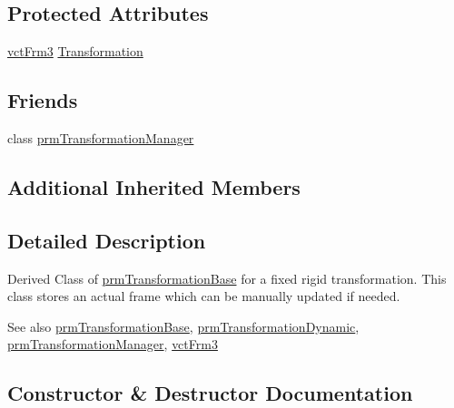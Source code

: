 \subsection*{Protected Attributes}
\begin{DoxyCompactItemize}
\item 
\hyperlink{vct_transformation_types_8h_a81feda0a02c2d1bc26e5553f409fed20}{vct\+Frm3} \hyperlink{classprm_transformation_fixed_a3b213d736a137afc62afc53ca79597b1}{Transformation}
\end{DoxyCompactItemize}
\subsection*{Friends}
\begin{DoxyCompactItemize}
\item 
class \hyperlink{classprm_transformation_fixed_af7fc0618e84bdf8b1d22bc2635f29eea}{prm\+Transformation\+Manager}
\end{DoxyCompactItemize}
\subsection*{Additional Inherited Members}


\subsection{Detailed Description}
Derived Class of \hyperlink{classprm_transformation_base}{prm\+Transformation\+Base} for a fixed rigid transformation. This class stores an actual frame which can be manually updated if needed.

\begin{DoxySeeAlso}{See also}
\hyperlink{classprm_transformation_base}{prm\+Transformation\+Base}, \hyperlink{classprm_transformation_dynamic}{prm\+Transformation\+Dynamic}, \hyperlink{classprm_transformation_manager}{prm\+Transformation\+Manager}, \hyperlink{vct_transformation_types_8h_a81feda0a02c2d1bc26e5553f409fed20}{vct\+Frm3} 
\end{DoxySeeAlso}


\subsection{Constructor \& Destructor Documentation}
\hypertarget{classprm_transformation_fixed_a7a92a2443e42386db2ee611900185b75}{}
